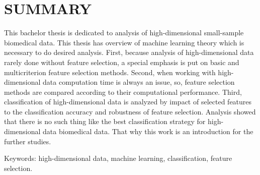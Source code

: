 \section*{SUMMARY}
\label{summary}

This bachelor thesis is dedicated to analysis of high-dimensional small-sample biomedical data. This thesis has overview of machine learning theory which is necessary to do desired analysis. First, because analysis of high-dimensional data rarely done without feature selection, a special emphasis is put on basic and multicriterion feature selection methods. Second, when working with high-dimensional data computation time is always an issue, so, feature selection methods are compared according to their computational performance. Third, classification of high-dimensional data is analyzed by impact of selected features to the classification accuracy and robustness of feature selection. Analysis showed that there is no such thing like the best classification strategy for high-dimensional data biomedical data. That why this work is an introduction for the further studies.


Keywords: high-dimensional data, machine learning, classification, feature selection.
